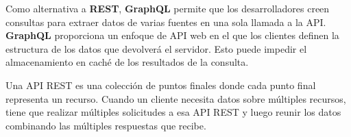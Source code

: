 Como alternativa a \textbf{REST}, \textbf{GraphQL} permite que los desarrolladores creen consultas para extraer datos de varias fuentes en una sola llamada a la API. \textbf{GraphQL} proporciona un enfoque de API web en el que los clientes definen la estructura de los datos que devolverá el servidor. Esto puede impedir el almacenamiento en caché  de los resultados de la consulta.
 
 \begin{tcolorbox}
	[colback=green!5!white,colframe=green!75!black,fonttitle=\bfseries, title=Problema de API REST]
		Una API REST es una colección de  puntos finales donde cada punto final representa un recurso. Cuando un cliente necesita datos sobre múltiples recursos, tiene que realizar múltiples solicitudes a esa API REST y luego reunir los datos combinando las múltiples respuestas que recibe.
\end{tcolorbox}
